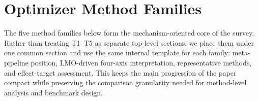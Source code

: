 \section{Optimizer Method Families}
\label{sec:optimizer-families}

The five method families below form the mechanism-oriented core of the
survey.  Rather than treating T1--T5 as separate top-level sections, we place
them under one common section and use the same internal template for each
family: meta-pipeline position, LMO-driven four-axis interpretation,
representative methods, and effect-target assessment. This keeps the main progression of the paper compact while preserving the comparison granularity needed for method-level analysis and benchmark design.





